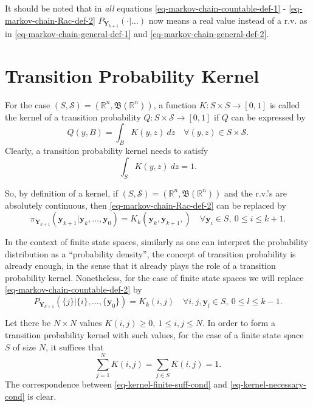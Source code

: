 It should be noted that in {\it all} equations
\eqref{eq-markov-chain-countable-def-1}
-
\eqref{eq-markov-chain-Rac-def-2}
$P_{\mathbf{Y}_{k+1}}(\cdot|\ldots)$ now means a real value
instead of a r.v. as in \eqref{eq-markov-chain-general-def-1} and \eqref{eq-markov-chain-general-def-2}.

\section{Transition Probability Kernel}

For the case $(S,\mathcal{S})=(\mathbb{R}^n,\mathfrak{B}(\mathbb{R}^n))$,
a function $K:S\times S\rightarrow [0,1]$ is called the kernel of
a transition probability $Q:S\times\mathcal{S}\rightarrow [0,1]$
if $Q$ can be expressed by
\begin{equation*}
Q(y,B) = \int_B {K}(y,z)~dz \quad\forall (y,z)\in S\times\mathcal{S}.
\end{equation*}
Clearly, a transition probability kernel needs to satisfy
\begin{equation}\label{eq-kernel-necessary-cond}
\int_S {K}(y,z)~dz=1.
\end{equation}

So, by definition of a kernel, 
if $(S,\mathcal{S})=(\mathbb{R}^n,\mathfrak{B}(\mathbb{R}^n))$ and
the r.v.'s are absolutely continuous,
then
\eqref{eq-markov-chain-Rac-def-2} can be replaced by
\begin{equation}\label{eq-markov-chain-Rac-def-3}
\pi_{\mathbf{Y}_{k+1}}(
\mathbf{y}_{k+1}
|
\mathbf{y}_k,
\ldots,
\mathbf{y}_0
)
=
K_k(
\mathbf{y}_k,
\mathbf{y}_{k+1},
)
\quad\forall
\mathbf{y}_i\in S,~0\leqslant i\leqslant k+1.
\end{equation}

In the context of finite state spaces, similarly as one can interpret the probability distribution as a ``probability density'',
the concept of transition probability is already enough, in the sense that it already plays the role of a transition probability kernel.
Nonetheless, for the case of finite state spaces we will replace \eqref{eq-markov-chain-countable-def-2} by
\begin{equation}\label{eq-markov-chain-finite-def-3}
P_{\mathbf{Y}_{k+1}}(
\{j\}
|
\{i\},
\ldots,
\{\mathbf{y}_0\}
)
=
K_k(i,j)
\quad\forall
i,j,\mathbf{y}_l\in S,~0\leqslant l\leqslant k-1.
\end{equation}

Let there be $N\times N$ values $K(i,j)\geqslant 0,~1\leqslant i,j\leqslant N$.
In order to form a transition probability kernel with such values, for the case of a finite state space $S$ of size $N$, it suffices that
\begin{equation}\label{eq-kernel-finite-suff-cond}
\sum_{j=1}^N K(i,j) = \sum_{j\in S}K(i,j) = 1.
\end{equation}
The correspondence between \eqref{eq-kernel-finite-suff-cond} and \eqref{eq-kernel-necessary-cond} is clear.

